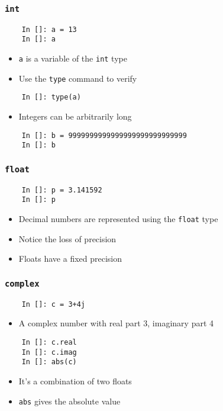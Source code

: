 \begin{frame}[fragile]
  \frametitle{\texttt{int}}
  \begin{lstlisting}
    In []: a = 13
    In []: a
  \end{lstlisting}
  \begin{itemize}
  \item \texttt{a} is a variable of the \texttt{int} type
  \item Use the \texttt{type} command to verify
  \end{itemize}
  \begin{lstlisting}
    In []: type(a)
  \end{lstlisting}
  \begin{itemize}
  \item Integers can be arbitrarily long
  \end{itemize}
  \begin{lstlisting}
    In []: b = 9999999999999999999999999999
    In []: b
  \end{lstlisting}
\end{frame}

\begin{frame}[fragile]
  \frametitle{\texttt{float}}
  \begin{lstlisting}
    In []: p = 3.141592
    In []: p
  \end{lstlisting}
  \begin{itemize}
  \item Decimal numbers are represented using the \texttt{float} type
  \item Notice the loss of precision
  \item Floats have a fixed precision
  \end{itemize}
\end{frame}

\begin{frame}[fragile]
  \frametitle{\texttt{complex}}
  \begin{lstlisting}
    In []: c = 3+4j
  \end{lstlisting}
  \begin{itemize}
  \item A complex number with real part 3, imaginary part 4
  \end{itemize}
  \begin{lstlisting}
    In []: c.real
    In []: c.imag
    In []: abs(c)
  \end{lstlisting}
  \begin{itemize}
  \item It's a combination of two floats
  \item \texttt{abs} gives the absolute value
  \end{itemize}
\end{frame}

